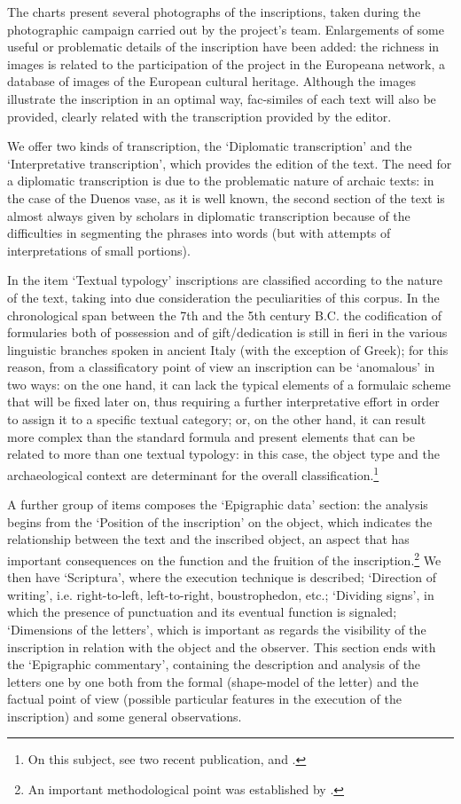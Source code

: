 \documentclass[amsthm,ebook]{saparticle}
\begin{document}
The charts present several photographs of the inscriptions, taken during the photographic campaign carried out by the
project's team. Enlargements of some useful or problematic details of the inscription have been added: the richness in
images is related to the participation of the project in the Europeana network, a database of images of the European
cultural heritage. Although the images illustrate the inscription in an optimal way, fac-similes of each text will also
be provided, clearly related with the transcription provided by the editor. 

We offer two kinds of transcription, the ‘Diplomatic transcription' and the ‘Interpretative transcription', which
provides the edition of the text. The need for a diplomatic transcription is due to the problematic nature of archaic
texts: in the case of the Duenos vase, as it is well known, the second section of the text is almost always given by
scholars in diplomatic transcription because of the difficulties in segmenting the phrases into words (but with
attempts of interpretations of small portions). 

In the item `Textual typology' inscriptions are classified according to the nature of the text, taking into due
consideration the peculiarities of this corpus. In the chronological span between the 7th and the 5th century B.C. the
codification of formularies both of possession and of gift/dedication is still in fieri in the various linguistic
branches spoken in ancient Italy (with the exception of Greek); for this reason, from a classificatory point of view an
inscription can be ‘anomalous' in two ways: on the one hand, it can lack the typical elements of a formulaic scheme
that will be fixed later on, thus requiring a further interpretative effort in order to assign it to a specific textual
category; or, on the other hand, it can result more complex than the standard formula and present elements that can be
related to more than one textual typology: in this case, the object type and the archaeological context are determinant
for the overall classification.\footnote{On this subject, see two recent publication, \citet{poccetti_paradigmi_2009} and \citet{maras_storie_2015}.} 

A further group of items composes the ‘Epigraphic data' section: the analysis begins from the ‘Position of the
inscription' on the object, which indicates the relationship between the text and the inscribed object, an aspect that
has important consequences on the function and the fruition of the inscription.\footnote{An important methodological
point was established by \citet{susini_epigrafia_1982}.} We then have ‘Scriptura', where the execution technique is described;
‘Direction of writing', i.e. right-to-left, left-to-right, boustrophedon, etc.; ‘Dividing signs', in which the presence
of punctuation and its eventual function is signaled; ‘Dimensions of the letters', which is important as regards the
visibility of the inscription in relation with the object and the observer. This section ends with the ‘Epigraphic
commentary', containing the description and analysis of the letters one by one both from the formal (shape-model of the
letter) and the factual point of view (possible particular features in the execution of the inscription) and some
general observations.
\end{document}
